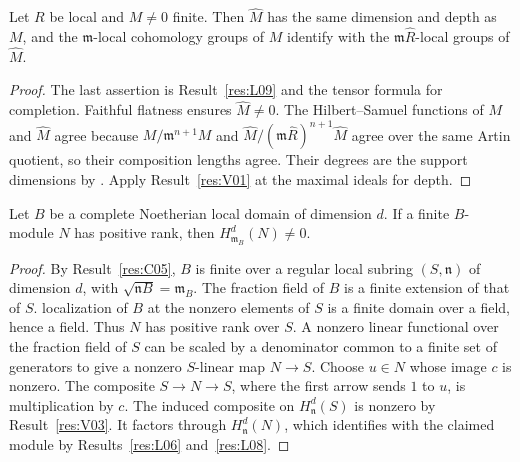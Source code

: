 \begin{proposition}\label{res:V04}
Let \(R\) be local and \(M\ne0\) finite. Then \(\widehat M\) has
the same dimension and depth as \(M\), and the \(\mathfrak m\)-local
cohomology groups of \(M\) identify with the
\(\mathfrak m\widehat R\)-local groups of \(\widehat M\).
\end{proposition}
\begin{proof}
The last assertion is Result~\ref{res:L09} and the tensor formula for
completion. Faithful flatness ensures \(\widehat M\ne0\).
The Hilbert--Samuel functions of \(M\) and \(\widehat M\) agree
because \(M/\mathfrak m^{n+1}M\) and
\(\widehat M/(\mathfrak m\widehat R)^{n+1}\widehat M\) agree over
the same Artin quotient, so their composition lengths agree.
Their degrees are the support dimensions by
\cite[ALG-05-C03-S02, ALG-05-C04-R03 and S01]{p103}.
Apply Result~\ref{res:V01} at the maximal ideals for depth.
\end{proof}

\begin{lemma}\label{res:V05}
Let \(B\) be a complete Noetherian local domain of dimension \(d\).
If a finite \(B\)-module \(N\) has positive rank, then
\(H^d_{\mathfrak m_B}(N)\ne0\).
\end{lemma}
\begin{proof}
By Result~\ref{res:C05}, \(B\) is finite over a regular local
subring \((S,\mathfrak n)\) of dimension \(d\), with
\(\sqrt{\mathfrak nB}=\mathfrak m_B\).
The fraction field of \(B\) is a finite extension of that of \(S\).
localization of \(B\) at the nonzero elements of \(S\) is a finite domain
over a field, hence a field. Thus \(N\) has positive rank over \(S\).
A nonzero linear functional over the fraction field of \(S\) can be
scaled by a denominator common to a finite set of generators to give
a nonzero \(S\)-linear map \(N\to S\). Choose \(u\in N\) whose image
\(c\) is nonzero. The composite \(S\to N\to S\), where the first
arrow sends \(1\) to \(u\), is multiplication by \(c\).
The induced composite on \(H^d_{\mathfrak n}(S)\) is nonzero by
Result~\ref{res:V03}. It factors through \(H^d_{\mathfrak n}(N)\),
which identifies with the claimed module by Results~\ref{res:L06}
and~\ref{res:L08}.
\end{proof}


